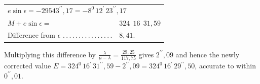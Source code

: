 \begin{center}
\begin{tabular}{@{}ll@{}}
\multicolumn{2}{l}{$e\sin\epsilon=-29543^{\prime\prime}{,}17=-8^0\,12^{\prime}\,23^{\prime\prime}{,}17$}\\[.3em]
$M+e\sin\epsilon=$ & $324\ \ 16\ \ 31{,}59$\\[.3em]
Difference from $\epsilon$ .\,.\,.\,.\,.\,.\,.\,.\,.\,.\,.\,.\,.\,.\,.\,. & $8{,}41$.
\end{tabular}
\end{center}
\noindent Multiplying this difference by $\frac{\lambda}{\mu-\lambda}=\frac{29{,}25}{117{,}75}$ gives $2^{\prime\prime}{,}09$ and hence the newly corrected value $E=324^0\,16^{\prime}\,31^{\prime\prime}{,}59-2^{\prime\prime}{,}09=324^0\,16^{\prime}\,29^{\prime\prime}{,}50$, accurate to within $0^{\prime\prime}{,}01$.
